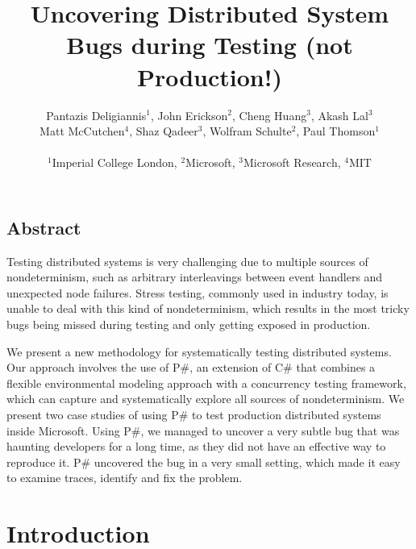 \documentclass[letterpaper,twocolumn,10pt]{article}
\newcommand{\psharp}{P\#\xspace}
\newcommand{\csharp}{C\#\xspace}
\begin{document}
\date{}

\title{\Large \bf Uncovering Distributed System Bugs during Testing (not Production!)}

\author{
{\rm Pantazis Deligiannis$^1$, John Erickson$^2$, Cheng Huang$^3$, Akash Lal$^3$}\\
{\rm Matt McCutchen$^4$, Shaz Qadeer$^3$, Wolfram Schulte$^2$, Paul Thomson$^1$}\\\\
$^1$Imperial College London, $^2$Microsoft, $^3$Microsoft Research, $^4$MIT
} %

\maketitle

\thispagestyle{empty}


\subsection*{Abstract}
Testing distributed systems is very challenging due to multiple sources of nondeterminism, such as arbitrary interleavings between event handlers and unexpected node failures. Stress testing, commonly used in industry today, is unable to deal with this kind of nondeterminism, which results in the most tricky bugs being missed during testing and only getting exposed in production.

We present a new methodology for systematically testing distributed systems. Our approach involves the use of \psharp, an extension of \csharp that combines a flexible environmental modeling approach with a concurrency testing framework, which can capture and systematically explore all sources of nondeterminism. We present two case studies of using \psharp to test production distributed systems inside Microsoft. Using \psharp, we managed to uncover a very subtle bug that was haunting developers for a long time, as they did not have an effective way to reproduce it. \psharp uncovered the bug in a very small setting, which made it easy to examine traces, identify and fix the problem.

\section{Introduction}
\label{sec:intro}
\end{document}
